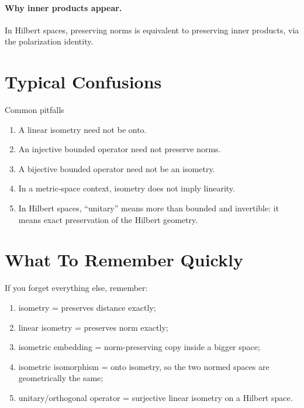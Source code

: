 \documentclass[header={Ancillary Note: Isometries},notheorems]{study-note}
\begin{document}
\paragraph{Why inner products appear.}
In Hilbert spaces, preserving norms is equivalent to preserving inner products, via the polarization identity.

\section{Typical Confusions}

\begin{warningbox}{Common pitfalls}
\begin{enumerate}
\item A linear isometry need not be onto.
\item An injective bounded operator need not preserve norms.
\item A bijective bounded operator need not be an isometry.
\item In a metric-space context, isometry does not imply linearity.
\item In Hilbert spaces, ``unitary'' means more than bounded and invertible: it means exact preservation of the Hilbert geometry.
\end{enumerate}
\end{warningbox}

\section{What To Remember Quickly}

\begin{focusbox}
If you forget everything else, remember:
\begin{enumerate}
\item isometry = preserves distance exactly;
\item linear isometry = preserves norm exactly;
\item isometric embedding = norm-preserving copy inside a bigger space;
\item isometric isomorphism = onto isometry, so the two normed spaces are geometrically the same;
\item unitary/orthogonal operator = surjective linear isometry on a Hilbert space.
\end{enumerate}
\end{focusbox}
\end{document}
